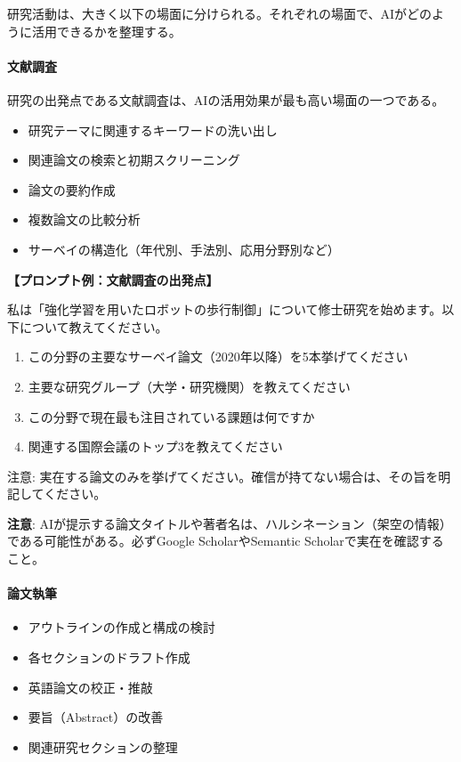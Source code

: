 研究活動は、大きく以下の場面に分けられる。それぞれの場面で、AIがどのように活用できるかを整理する。

\paragraph{文献調査}
研究の出発点である文献調査は、AIの活用効果が最も高い場面の一つである。
\begin{itemize}
\item 研究テーマに関連するキーワードの洗い出し
\item 関連論文の検索と初期スクリーニング
\item 論文の要約作成
\item 複数論文の比較分析
\item サーベイの構造化（年代別、手法別、応用分野別など）
\end{itemize}

\begin{promptbox}
\textbf{【プロンプト例：文献調査の出発点】}

私は「強化学習を用いたロボットの歩行制御」について修士研究を始めます。以下について教えてください。

\begin{enumerate}
\item この分野の主要なサーベイ論文（2020年以降）を5本挙げてください
\item 主要な研究グループ（大学・研究機関）を教えてください
\item この分野で現在最も注目されている課題は何ですか
\item 関連する国際会議のトップ3を教えてください
\end{enumerate}

注意: 実在する論文のみを挙げてください。確信が持てない場合は、その旨を明記してください。
\end{promptbox}

\begin{screen}
\textbf{注意}: AIが提示する論文タイトルや著者名は、ハルシネーション（架空の情報）である可能性がある。必ずGoogle ScholarやSemantic Scholarで実在を確認すること。
\end{screen}

\paragraph{論文執筆}
\begin{itemize}
\item アウトラインの作成と構成の検討
\item 各セクションのドラフト作成
\item 英語論文の校正・推敲
\item 要旨（Abstract）の改善
\item 関連研究セクションの整理
\end{itemize}

